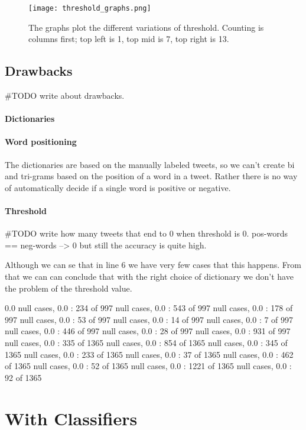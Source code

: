 \begin{figure}[htb]
    \centering
    \texttt{[image: threshold\_graphs.png]} 
    \caption{The graphs plot the different variations of threshold. Counting is
columns first; top left is 1, top mid is 7, top right is 13.}
    \label{fig:threshold_graphs}
\end{figure}

\subsection{Drawbacks}
#TODO write about drawbacks.
\paragraph{Dictionaries}
\paragraph{Word positioning}
The dictionaries are based on the manually labeled
tweets, so we can't create bi and tri-grams based on the position of a word in a tweet.
Rather there is no way of automatically decide if a single word is positive or
negative. 

\paragraph{Threshold}
#TODO write how many tweets that end to 0 when threshold is 0.
pos-words == neg-words --> 0 but still the accuracy is quite high.

Although we can se that in line 6 we have very few cases that this happens.
From that we can can conclude that with the right choice of dictionary we don't
have the problem of the threshold value. 

0.0
null cases, 0.0 : 234 of 997
null cases, 0.0 : 543 of 997
null cases, 0.0 : 178 of 997
null cases, 0.0 : 53 of 997
null cases, 0.0 : 14 of 997
null cases, 0.0 : 7 of 997
null cases, 0.0 : 446 of 997
null cases, 0.0 : 28 of 997
null cases, 0.0 : 931 of 997
null cases, 0.0 : 335 of 1365
null cases, 0.0 : 854 of 1365
null cases, 0.0 : 345 of 1365
null cases, 0.0 : 233 of 1365
null cases, 0.0 : 37 of 1365
null cases, 0.0 : 462 of 1365
null cases, 0.0 : 52 of 1365
null cases, 0.0 : 1221 of 1365
null cases, 0.0 : 92 of 1365

\section{With Classifiers}

